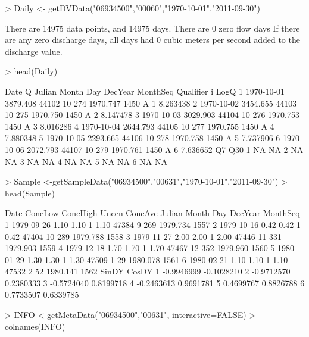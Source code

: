 \documentclass[a4paper,11pt]{article}
\begin{document}
\begin{Schunk}
\begin{Sinput}
> Daily <- getDVData("06934500","00060","1970-10-01","2011-09-30")
\end{Sinput}
\begin{Soutput}
There are  14975 data points, and  14975 days.
There are  0 zero flow days
If there are any zero discharge days, all days had 0 cubic meters per second added to the discharge value.
\end{Soutput}
\begin{Sinput}
> head(Daily)
\end{Sinput}
\begin{Soutput}
        Date        Q Julian Month Day  DecYear MonthSeq Qualifier i     LogQ
1 1970-10-01 3879.408  44102    10 274 1970.747     1450         A 1 8.263438
2 1970-10-02 3454.655  44103    10 275 1970.750     1450         A 2 8.147478
3 1970-10-03 3029.903  44104    10 276 1970.753     1450         A 3 8.016286
4 1970-10-04 2644.793  44105    10 277 1970.755     1450         A 4 7.880348
5 1970-10-05 2293.665  44106    10 278 1970.758     1450         A 5 7.737906
6 1970-10-06 2072.793  44107    10 279 1970.761     1450         A 6 7.636652
  Q7 Q30
1 NA  NA
2 NA  NA
3 NA  NA
4 NA  NA
5 NA  NA
6 NA  NA
\end{Soutput}
\begin{Sinput}
> Sample <-getSampleData("06934500","00631","1970-10-01","2011-09-30")
> head(Sample)
\end{Sinput}
\begin{Soutput}
        Date ConcLow ConcHigh Uncen ConcAve Julian Month Day  DecYear MonthSeq
1 1979-09-26    1.10     1.10     1    1.10  47384     9 269 1979.734     1557
2 1979-10-16    0.42     0.42     1    0.42  47404    10 289 1979.788     1558
3 1979-11-27    2.00     2.00     1    2.00  47446    11 331 1979.903     1559
4 1979-12-18    1.70     1.70     1    1.70  47467    12 352 1979.960     1560
5 1980-01-29    1.30     1.30     1    1.30  47509     1  29 1980.078     1561
6 1980-02-21    1.10     1.10     1    1.10  47532     2  52 1980.141     1562
       SinDY      CosDY
1 -0.9946999 -0.1028210
2 -0.9712570  0.2380333
3 -0.5724040  0.8199718
4 -0.2463613  0.9691781
5  0.4699767  0.8826788
6  0.7733507  0.6339785
\end{Soutput}
\begin{Sinput}
> INFO <-getMetaData("06934500","00631", interactive=FALSE)
> colnames(INFO)
\end{Sinput}
\begin{Soutput}

\end{Soutput}
\end{Schunk}
\end{document}
